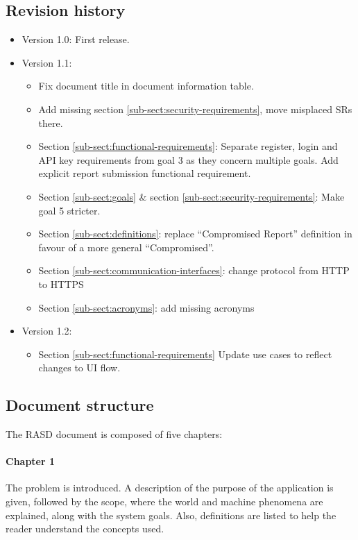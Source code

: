 \subsection{Revision history}
\begin{itemize}
    \item Version 1.0: First release.
    \item Version 1.1: 
        \begin{itemize}
            \item Fix document title in document information table.
            \item Add missing section \ref{sub-sect:security-requirements}, move misplaced SRs there.
            \item Section \ref{sub-sect:functional-requirements}: Separate register, login and API key requirements from goal 3 as they concern multiple goals. Add explicit report submission functional requirement.
            \item Section \ref{sub-sect:goals} \& section \ref{sub-sect:security-requirements}: Make goal 5 stricter.
            \item Section \ref{sub-sect:definitions}: replace “Compromised Report” definition in favour of a more general “Compromised”.
            \item Section \ref{sub-sect:communication-interfaces}: change protocol from HTTP to HTTPS
            \item Section \ref{sub-sect:acronyms}: add missing acronyms
        \end{itemize}
    \item Version 1.2:
        \begin{itemize}
            \item Section \ref{sub-sect:functional-requirements} Update use cases to reflect changes to UI flow.
        \end{itemize}
\end{itemize}

\subsection{Document structure}
The RASD document is composed of five chapters:

\paragraph{Chapter 1} The problem is introduced. A description of the purpose of the application is given, followed by the scope, where the world and machine phenomena are explained, along with the system goals. Also, definitions are listed to help the reader understand the concepts used.

